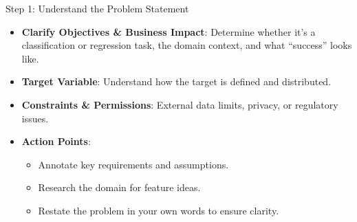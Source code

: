 \documentclass[10pt,compress,t,notes=noshow, xcolor=table]{beamer}
\begin{document}


\begin{frame}{Step 1: Understand the Problem Statement}
\begin{itemize}
  \item \textbf{Clarify Objectives \& Business Impact}: Determine whether it's a classification or regression task, the domain context, and what “success” looks like.
  \item \textbf{Target Variable}: Understand how the target is defined and distributed.
  \item \textbf{Constraints \& Permissions}: External data limits, privacy, or regulatory issues.
  \item \textbf{Action Points}:
    \begin{itemize}
      \item Annotate key requirements and assumptions.
      \item Research the domain for feature ideas.
      \item Restate the problem in your own words to ensure clarity.
    \end{itemize}
\end{itemize}
\end{frame}
\end{document}
